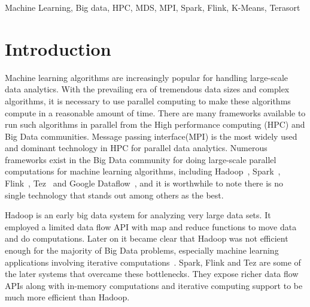 \documentclass[conference]{IEEEtran}
\begin{document}
\begin{IEEEkeywords}
Machine Learning, Big data, HPC, MDS, MPI, Spark, Flink, K-Means, Terasort
\end{IEEEkeywords}






%
\IEEEpeerreviewmaketitle



\section{Introduction}
Machine learning algorithms are increasingly popular for handling large-scale data analytics. With the prevailing era of tremendous data sizes and complex algorithms, it is necessary to use parallel computing to make these algorithms compute in a reasonable amount of time. There are many frameworks available to run such algorithms in parallel from the High performance computing (HPC) and Big Data communities. Message passing interface(MPI) is the most widely used and dominant technology in HPC for parallel data analytics. Numerous frameworks exist in the Big Data community for doing large-scale parallel computations for machine learning algorithms, including Hadoop~\cite{White:2009:HDG:1717298}, Spark~\cite{Zaharia:2010:SCC:1863103.1863113}, Flink~\cite{apache_flink, carbone2015lightweight}, Tez~\cite{saha2015apache} and Google Dataflow~\cite{akidau2015dataflow}, and it is worthwhile to note there is no single technology that stands out among others as the best. 

Hadoop is an early big data system for analyzing very large data sets. It employed a limited data flow API with map and reduce functions to move data and do computations. Later on it became clear that Hadoop was not efficient enough for the majority of Big Data problems, especially machine learning applications involving iterative computations~\cite{Ekanayake:2010:TRI:1851476.1851593}. Spark, Flink and Tez are some of the later systems that overcame these bottlenecks. They expose richer data flow APIs along with in-memory computations and iterative computing support to be much more efficient than Hadoop.
\end{document}

